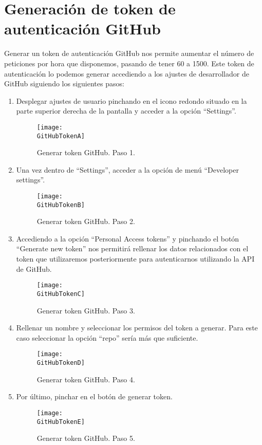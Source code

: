 \section{Generación de token de autenticación GitHub}

Generar un token de autenticación GitHub nos permite aumentar el número de peticiones por hora que disponemos, pasando de tener 60 a 1500.
Este token de autenticación lo podemos generar accediendo a los ajustes de desarrollador de GitHub siguiendo los siguientes pasos:

\begin{enumerate}
    \item Desplegar ajustes de usuario pinchando en el icono redondo situado en la parte superior derecha de la pantalla y acceder a la opción ``Settings''.

    \begin{figure}[h]
        \centering
        \texttt{[image: \\GitHubTokenA]}
        \caption{Generar token GitHub. Paso 1.}
    \end{figure}

    \item Una vez dentro de “Settings”, acceder a la opción de menú ``Developer settings''.

    \begin{figure}
        \centering
        \texttt{[image: \\GitHubTokenB]}
        \caption{Generar token GitHub. Paso 2.}
    \end{figure}

    \newpage

    \item Accediendo a la opción ``Personal Access tokens'' y pinchando el botón ``Generate new token'' nos permitirá rellenar los datos relacionados con el token que utilizaremos posteriormente para autenticarnos utilizando la API de GitHub.
    
    \begin{figure}[h]
        \centering
        \texttt{[image: \\GitHubTokenC]}
        \caption{Generar token GitHub. Paso 3.}
    \end{figure}

    \item Rellenar un nombre y seleccionar los permisos del token a generar. Para este caso seleccionar la opción ``repo'' sería más que suficiente.
    
    \begin{figure}[h]
        \centering
        \texttt{[image: \\GitHubTokenD]}
        \caption{Generar token GitHub. Paso 4.}
    \end{figure}

    \item Por último, pinchar en el botón de generar token.

    \begin{figure}[h]
        \centering
        \texttt{[image: \\GitHubTokenE]}
        \caption{Generar token GitHub. Paso 5.}
    \end{figure}

\end{enumerate}